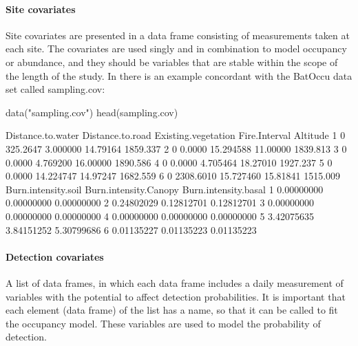 \documentclass[article]{jss}
\begin{document}
\paragraph{Site covariates}\label{site-covariates}

Site covariates are presented in a data frame consisting of measurements
taken at each site. The covariates are used singly and in combination to
model occupancy or abundance, and they should be variables that are
stable within the scope of the length of the study. In
 there is an example concordant with the BatOccu
data set called sampling.cov:

\begin{CodeChunk}
\begin{CodeInput}
data("sampling.cov")
head(sampling.cov)
\end{CodeInput}
\end{CodeChunk}

\begin{CodeChunk}
\begin{CodeOutput}
  Distance.to.water Distance.to.road Existing.vegetation Fire.Interval Altitude
1                 0         325.2647            3.000000      14.79164 1859.337
2                 0           0.0000           15.294588      11.00000 1839.813
3                 0           0.0000            4.769200      16.00000 1890.586
4                 0           0.0000            4.705464      18.27010 1927.237
5                 0           0.0000           14.224747      14.97247 1682.559
6                 0        2308.6010           15.727460      15.81841 1515.009
  Burn.intensity.soil Burn.intensity.Canopy Burn.intensity.basal
1          0.00000000            0.00000000           0.00000000
2          0.24802029            0.12812701           0.12812701
3          0.00000000            0.00000000           0.00000000
4          0.00000000            0.00000000           0.00000000
5          3.42075635            3.84151252           5.30799686
6          0.01135227            0.01135223           0.01135223
\end{CodeOutput}
\end{CodeChunk}

\paragraph{Detection covariates}\label{detection-covariates}

A list of data frames, in which each data frame includes a daily
measurement of variables with the potential to affect detection
probabilities. It is important that each element (data frame) of the
list has a name, so that it can be called to fit the occupancy model.
These variables are used to model the probability of detection.
\end{document}
